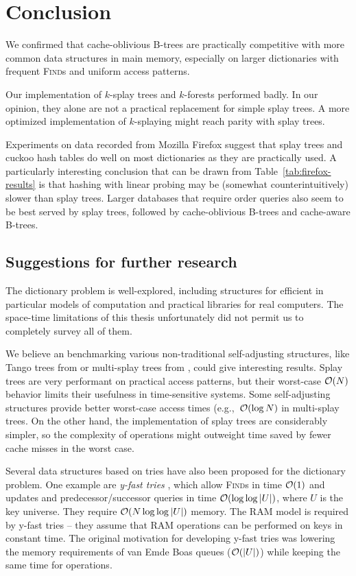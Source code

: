 \chapter*{Conclusion}

We confirmed that cache-oblivious B-trees are practically competitive with
more common data structures in main memory, especially on larger dictionaries
with frequent \textsc{Find}s and uniform access patterns.

Our implementation of $k$-splay trees and $k$-forests performed badly.
In our opinion, they alone are not a practical replacement for simple splay
trees. A more optimized implementation of $k$-splaying might reach parity with
splay trees.

Experiments on data recorded from Mozilla Firefox suggest that splay trees
and cuckoo hash tables do well on most dictionaries as they are practically
used. A particularly interesting conclusion that can be drawn from
Table~\ref{tab:firefox-results} is that hashing with linear probing may
be (somewhat counterintuitively) slower than splay trees.
Larger databases that require order queries also seem to be best served
by splay trees, followed by cache-oblivious \mbox{B-trees} and cache-aware
\mbox{B-trees}.

\section*{Suggestions for further research}
The dictionary problem is well-explored, including structures for efficient
in particular models of computation and practical libraries for real computers.
The space-time limitations of this thesis unfortunately did not permit us to
completely survey all of them.

We believe an benchmarking various non-traditional self-adjusting structures,
like Tango trees from \cite{tango} or multi-splay trees from
\cite{multisplay-trees}, could give interesting results. Splay trees are very
performant on practical access patterns, but their worst-case $\mathcal{O}(N)$ behavior
limits their usefulness in time-sensitive systems. Some self-adjusting
structures provide better worst-case access times (e.g.,\ $\mathcal{O}(\log N)$ in
multi-splay trees. On the other hand, the implementation of splay trees
are considerably simpler, so the complexity of operations might outweight
time saved by fewer cache misses in the worst case.

Several data structures based on tries have also been proposed for the
dictionary problem. One example are \emph{y-fast tries} \cite{y-fast},
which allow \textsc{Find}s in time $\mathcal{O}(1)$ and updates and predecessor/successor
queries in time $\mathcal{O}(\log\log |U|)$, where $U$ is the key universe. They require
$\mathcal{O}(N \log\log |U|)$ memory.
The RAM model is required by y-fast tries -- they assume that RAM operations
can be performed on keys in constant time.
The original motivation for developing y-fast tries was lowering the memory
requirements of van Emde Boas queues ($\mathcal{O}(|U|)$) while keeping the same time
for operations.


